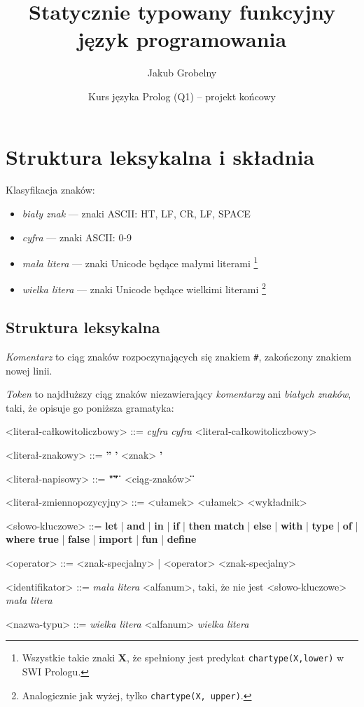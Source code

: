 \documentclass[12pt]{article}
\title{\huge
    \textbf{Statycznie typowany funkcyjny język programowania}}
\date {Kurs języka Prolog (Q1) -- projekt końcowy}
\author{\Large Jakub Grobelny}
\begin{document}
\maketitle

\section{Struktura leksykalna i składnia}

Klasyfikacja znaków:
\begin{itemize}
    \item \textit{biały znak} --- znaki ASCII: HT, LF, CR, LF, SPACE
    \item \textit{cyfra} --- znaki ASCII: 0-9
    \item \textit{mała litera} --- znaki Unicode będące małymi literami 
    \footnote{Wszystkie takie znaki \textbf{X}, że spełniony jest predykat 
        \texttt{char\textunderscore type(X,lower)} w SWI Prologu.}
    \item \textit{wielka litera} --- znaki Unicode będące wielkimi literami
    \footnote{Analogicznie jak wyżej, tylko 
        \texttt{char\textunderscore type(X, upper)}.}
\end{itemize}

\subsection{Struktura leksykalna}

\textit{Komentarz} to ciąg znaków rozpoczynających się znakiem \texttt{\#}, 
zakończony znakiem nowej linii.

\textit{Token} to najdłuższy ciąg znaków niezawierający \textit{komentarzy} ani 
\textit{białych znaków}, taki, że opisuje go poniższa gramatyka:

\begin{grammar}

<literał-całkowitoliczbowy> ::=
    \textit{cyfra} 
    \alt \textit{cyfra} <literał-całkowitoliczbowy>

<literał-znakowy> ::=
    \textbf{''}
    \alt \textbf{'} <znak> \textbf{'}

<literał-napisowy> ::=
    \textbf{"\"\""}
    \alt \textbf{\"} <ciąg-znaków> \textbf{\"}

<literał-zmiennopozycyjny> ::=
    <ułamek>
    \alt <ułamek> <wykładnik>

<słowo-kluczowe> ::=
    \textbf{let}
    | \textbf{and}
    | \textbf{in}
    | \textbf{if}
    | \textbf{then}
    \alt \textbf{match}
    | \textbf{else}
    | \textbf{with}
    | \textbf{type}
    | \textbf{of}
    | \textbf{where}
    \alt \textbf{true}
    | \textbf{false}
    | \textbf{import}
    | \textbf{fun}
    | \textbf{define}

<operator> ::= <znak-specjalny> | <operator> <znak-specjalny>

<identifikator> ::= 
    \textit{mała litera} <alfanum>, taki, że nie jest <słowo-kluczowe>
    \alt \textit{mała litera}

<nazwa-typu> ::=
    \textit{wielka litera} <alfanum>
    \alt \textit{wielka litera}

\end{grammar}
\end{document}
